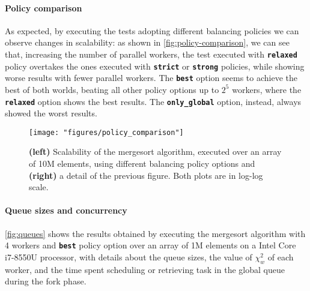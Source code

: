 \documentclass[11pt, a4paper]{article}
\begin{document}
\paragraph{Policy comparison} As expected, by executing the tests adopting different balancing policies we can observe changes in scalability: as shown in \autoref{fig:policy-comparison}, we can see that, increasing the number of parallel workers, the test executed with {\tt\bfseries relaxed} policy overtakes the ones executed with {\tt\bfseries strict} or {\tt\bfseries strong} policies, while showing worse results with fewer parallel workers. The {\tt\bfseries best} option seems to achieve the best of both worlds, beating all other policy options up to $2^5$ workers, where the {\tt\bfseries relaxed} option shows the best results. The {\tt\bfseries only\_global} option, instead, always showed the worst results.
%
\begin{figure}[b]
	\centering
	\texttt{[image: "figures/policy\_comparison"]}
	\caption{{\bf (left)} Scalability of the mergesort algorithm, executed over an array of 10M elements, using different balancing policy options and {\bf (right)} a detail of the previous figure. Both plots are in log-log scale.}
	\label{fig:policy-comparison}
\end{figure}

\paragraph{Queue sizes and concurrency} \autoref{fig:queues} shows the results obtained by executing the mergesort algorithm with 4 workers and {\tt\bfseries best} policy option over an array of 1M elements on a Intel Core i7-8550U processor, with details about the queue sizes, the value of $\chi^2_w$ of each worker, and the time spent scheduling or retrieving task in the global queue during the fork phase.
\end{document}

